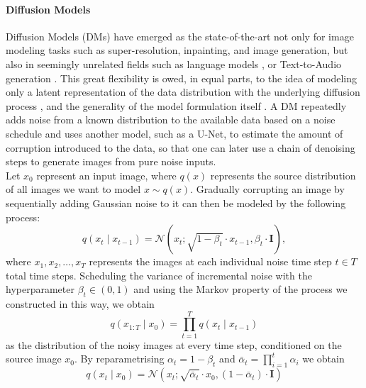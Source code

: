 \documentclass{article}
\begin{document}
\paragraph{Diffusion Models}

Diffusion Models (DMs) have emerged as the state-of-the-art not only for image modeling tasks such as super-resolution, inpainting, and image generation, but also in seemingly unrelated fields such as language models \cite{he2022diffusionbert}, or Text-to-Audio generation \cite{liu2023audioldm}. This great flexibility is owed, in equal parts, to the idea of modeling only a latent representation of the data distribution with the underlying diffusion process \cite{rombach2021highresolution}, and the generality of the model formulation itself \cite{ho2020denoising}.  
A DM repeatedly adds noise from a known distribution to the available data based on a noise schedule and uses another model, such as a U-Net, to estimate the amount of corruption introduced to the data, so that one can later use a chain of denoising steps to generate images from pure noise inputs. \\
Let $x_0$ represent an input image, where $q(x)$ represents the source distribution of all images we want to model $x \sim q(x)$. Gradually corrupting an image by sequentially adding Gaussian noise to it can then be modeled by the following process: 
\begin{equation}
    q\left(x_t \mid x_{t-1}\right)=\mathcal{N}\left(x_t ; \sqrt{1-\beta_t} \cdot x_{t-1}, \beta_t \cdot \mathbf{I}\right),
\end{equation}
where $x_1, x_2, \ldots, x_T$ represents the images at each individual noise time step $t \in T$ total time steps. Scheduling the variance of incremental noise with the hyperparameter $\beta_t \in (0, 1)$ and using the Markov property of the process we constructed in this way, we obtain \\
\begin{equation}
    q\left(x_{1: T} \mid x_0\right)=\prod_{t=1}^T q\left(x_t \mid x_{t-1}\right)
\end{equation}
as the distribution of the noisy images at every time step, conditioned on the source image $x_0$. By reparametrising $\alpha_t = 1- \beta_t$ and $\bar{\alpha}_t=\prod_{i=1}^t \alpha_i$ we obtain 
\begin{equation}
    q\left(x_t \mid x_0\right)=\mathcal{N}\left(x_t ; \sqrt{\bar{\alpha}_t} \cdot x_0,\left(1-\bar{\alpha}_t\right) \cdot \mathbf{I}\right)
\end{equation}
\end{document}

